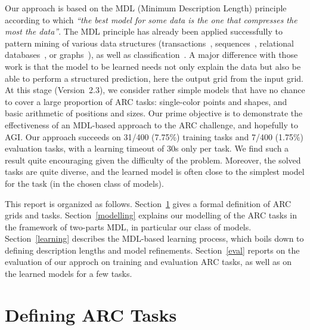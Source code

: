 \documentclass[a4paper]{llncs}
\newcommand{\HIDE}[1]{}
\begin{document}
Our approach is based on the MDL (Minimum Description Length)
principle~\cite{Rissanen1978,Grunwald2019} according to which {\em ``the best
model for some data is the one that compresses the most the data''}.
%
The MDL principle has already been applied successfully to pattern
mining of various data structures (transactions~\cite{KRIMP2011},
sequences~\cite{sqs2012}, relational databases~\cite{rdb_krimp2009},
or graphs~\cite{BarCelFer2020ida}), as well as
classification~\cite{ProLee2020}.
%
A major difference with those work is that the model to be learned
needs not only explain the data but also be able to perform a
structured prediction, here the output grid from the input grid.
%
At this stage (Version~2.3), we consider rather simple models that
have no chance to cover a large proportion of ARC tasks: single-color
points and shapes, and basic arithmetic of positions and sizes. Our
prime objective is to demonstrate the effectiveness of an MDL-based
approach to the ARC challenge, and hopefully to AGI. Our approach
succeeds on 31/400 (7.75\%) training tasks and 7/400 (1.75\%)
evaluation tasks, with a learning timeout of 30s only per task. We
find such a result quite encouraging given the difficulty of the
problem. Moreover, the solved tasks are quite diverse, and the
learned model is often close to the simplest model for the task (in
the chosen class of models).

This report is organized as follows. Section~\ref{arc} gives a formal
definition of ARC grids and tasks. \HIDE{Section~\ref{related} discusses
related work on artificial intelligence, in particular structured
prediction, AGI, or programming by demonstration; it also presents the
MDL principle and some of its applications to AI and knowledge
discovery.} Section~\ref{modelling} explains our modelling of the ARC
tasks in the framework of two-parts MDL, in particular our class of
models. Section~\ref{learning} describes the MDL-based learning
process, which boils down to defining description lengths and model
refinements. Section~\ref{eval} reports on the evaluation of our
approch on training and evaluation ARC tasks, as well as on the
learned models for a few tasks.


\section{Defining ARC Tasks}
\label{arc}
\end{document}
